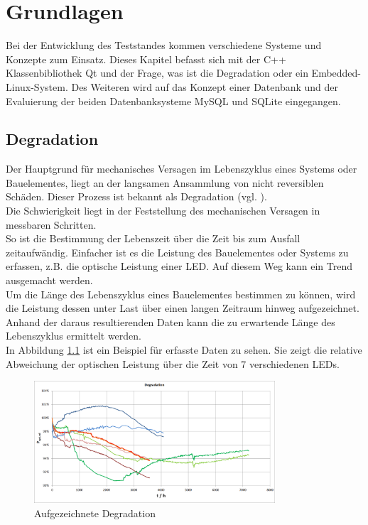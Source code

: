 \chapter{Grundlagen}
\label{chapter_Grundlagen}

Bei der Entwicklung des Teststandes kommen verschiedene Systeme und Konzepte zum Einsatz. Dieses Kapitel befasst sich mit der C++ Klassenbibliothek Qt und der Frage, was ist die Degradation oder ein Embedded-Linux-System. Des Weiteren wird auf das Konzept einer Datenbank und der Evaluierung der beiden Datenbanksysteme MySQL und SQLite eingegangen.

\section{Degradation}
\label{section_Degradation}
Der Hauptgrund für mechanisches Versagen im Lebenszyklus eines Systems oder Bauelementes, liegt an der langsamen Ansammlung von nicht reversiblen Schäden. Dieser Prozess ist bekannt als Degradation (vgl. \cite{zhou2011}).\\
Die Schwierigkeit liegt in der Feststellung des mechanischen Versagen in messbaren Schritten.\\
So ist die Bestimmung der Lebenszeit über die Zeit bis zum Ausfall zeitaufwändig. Einfacher ist es die Leistung des Bauelementes oder Systems zu erfassen, z.B. die optische Leistung einer \ac{LED}. Auf diesem Weg kann ein Trend ausgemacht werden.\\
Um die Länge des Lebenszyklus eines Bauelementes bestimmen zu können, wird die Leistung dessen unter Last über einen langen Zeitraum hinweg aufgezeichnet. Anhand der daraus resultierenden Daten kann die zu erwartende Länge des Lebenszyklus ermittelt werden.\\
In Abbildung \ref{figure_Degradation} ist ein Beispiel für erfasste Daten zu sehen. Sie zeigt die relative Abweichung der optischen Leistung über die Zeit von 7 verschiedenen \acp{LED}. 

 
\begin{figure}[H]
\begin{center}
\includegraphics[width=0.8\textwidth]{img/general/Degradation.png}
\caption{Aufgezeichnete Degradation}
\label{figure_Degradation}
\end{center}
\end{figure}



